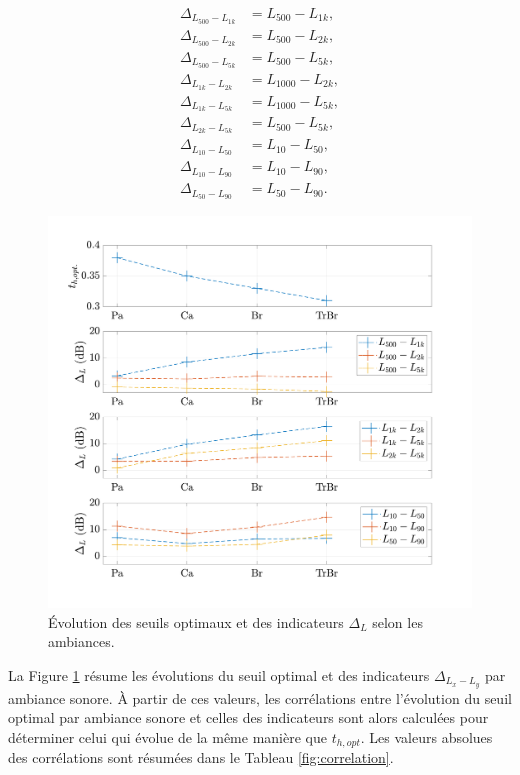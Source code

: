 \begin{subequations}\label{eq:delta_L}
\begin{align}
\Delta_{L_{500}-L_{1k}} &= L_{500}-L_{1k}, \\
\Delta_{L_{500}-L_{2k}} &= L_{500}-L_{2k}, \\
\Delta_{L_{500}-L_{5k}} &= L_{500}-L_{5k}, \\
\Delta_{L_{1k}-L_{2k}} &= L_{1000}-L_{2k}, \\
\Delta_{L_{1k}-L_{5k}} &= L_{1000}-L_{5k}, \\
\Delta_{L_{2k}-L_{5k}} &= L_{500}-L_{5k}, \\
\Delta_{L_{10}-L_{50}} &= L_{10}-L_{50}, \\
\Delta_{L_{10}-L_{90}} &= L_{10}-L_{90}, \\
\Delta_{L_{50}-L_{90}} &= L_{50}-L_{90}.
\end{align}
\end{subequations}

\begin{figure}[h]
\centering
\includegraphics[width=0.9\linewidth]{./figures/resultats/deltaL_opt.pdf}
\caption{Évolution des seuils optimaux et des indicateurs $\Delta_L$ selon les ambiances.}
\label{fig:delta_L}
\end{figure}


La Figure \ref{fig:delta_L} résume les évolutions du seuil optimal et des indicateurs $\Delta_{L_x-L_y}$ par ambiance sonore. \`A partir de ces valeurs, les corrélations entre l'évolution du seuil optimal par ambiance sonore et celles des indicateurs sont alors calculées pour déterminer celui qui évolue de la même manière que $t_{h,opt}$. Les valeurs absolues des corrélations sont résumées dans le Tableau \ref{fig:correlation}.

